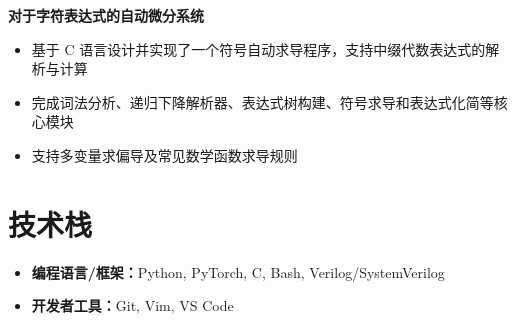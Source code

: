 \documentclass[letterpaper,12pt]{article}
\newcommand{\project}[1]{
  \vspace{3pt}\textbf{#1}\vspace{-3pt}
}
\newenvironment{projectitems}{
  \begin{itemize}[
    leftmargin=1.35em,
    itemsep=3.2pt,
    topsep=3pt,
    parsep=1pt,
    partopsep=0pt
  ]
}{
  \end{itemize}
}
\begin{document}
\project{对于字符表达式的自动微分系统}
\begin{projectitems}
  \item 基于 C 语言设计并实现了一个符号自动求导程序，支持中缀代数表达式的解析与计算
  \item 完成词法分析、递归下降解析器、表达式树构建、符号求导和表达式化简等核心模块
  \item 支持多变量求偏导及常见数学函数求导规则
\end{projectitems}

\section{技术栈}
\begin{itemize}
  \item \textbf{编程语言/框架：}Python, PyTorch, C, Bash, Verilog/SystemVerilog
  \item \textbf{开发者工具：}Git, Vim, VS Code
\end{itemize}
\end{document}
